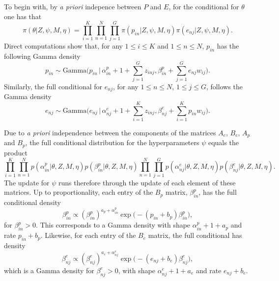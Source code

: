 \documentclass[11pt]{amsart}
\theoremstyle{definition}
\begin{document}
To begin with, by \emph{a priori} indepence between $P$ and $E$, for
the conditional for $\theta$ one has that 
\[
   \pi(\theta|Z, \psi, M, \eta) 
   = 
   \prod_{i=1}^K\prod_{n=1}^N\prod_{j=1}^G
    \pi(p_{in}|Z, \psi, M, \eta)
    \pi(e_{nj}|Z, \psi, M, \eta).
\]
Direct computations show that, for any $1 \leq i\leq K$ and $1\leq
n\leq  N$, $p_{in}$ has the following Gamma density
\begin{equation}
  \label{eqn:Full_for_P}
  p_{in} 
       \sim 
     \text{Gamma}\Big(p_{in}\,\Big|\, \alpha_{in}^p + 1 +
     \sum_{j=1}^G z_{inj}, \beta_{in}^p +
     \sum_{j=1}^G e_{nj}w_{ij}\Big).\tag{$s_2$}
\end{equation}
Similarly, the full conditional for $e_{nj}$, for any $1\leq n\leq 
N$, $1\leq j\leq G$, follows the Gamma density  
\begin{equation}
  \label{eqn:Full_for_E}
  e_{nj} 
     \sim 
   \text{Gamma}\Big(e_{nj}\,\Big|\, \alpha_{nj}^e + 1 +
   \sum_{i=1}^K z_{inj}, \beta_{nj}^e +
   \sum_{i=1}^K p_{in}w_{ij}\Big).\tag{$s_3$}
\end{equation}


Due to \emph{a priori} independence between the
components of the matrices $A_e$, $B_e$, $A_p$ and $B_p$, the full
conditional distribution for the hyperparameters $\psi$ equals the
product
\[
   \prod_{i=1}^K\prod_{n=1}^N
     p(\alpha_{in}^p| \theta, Z, M, \eta)
     p(\beta_{in}^p|\theta, Z, M, \eta)
   \prod_{n=1}^N\prod_{j=1}^G
     p(\alpha_{nj}^e|\theta, Z, M, \eta)
     p(\beta_{nj}^e|\theta, Z, M, \eta).
\]
The update for $\psi$ runs therefore through the update of each
element of these matrices. Up to proportionality, each entry of the
$B_p$ matrix, $\beta_{in}^p$,  has the full conditional density
\begin{equation}
 \label{eqn:Full_for_Bp}
 \beta_{in}^p
   \propto
   (\beta_{in}^p)^{a_p + \alpha_{in}^p} 
   \exp\Big(-(p_{in}+b_p)\beta_{in}^p\Big),\tag{$s_4$}
\end{equation}
for $\beta_{in}^p > 0$. This corresponds to a Gamma density with shape
$\alpha_{in}^p + 1 + a_p$ and rate $p_{in} + b_p$.  Likewise, for each
entry of the $B_e$ matrix, the full conditional has density 
\begin{equation}
 \label{eqn:Full_for_Be}
 \beta_{nj}^e
   \propto
  (\beta_{nj}^e)^{a_e + \alpha_{nj}^e} 
  \exp\Big(-(e_{nj}+b_e)\beta_{nj}^e\Big),\tag{$s_5$}
\end{equation}
which is a  Gamma density for $\beta_{nj}^e > 0$, with shape
$\alpha_{nj}^e + 1+ a_e$ and rate $e_{nj}+b_e$. 
\end{document}
